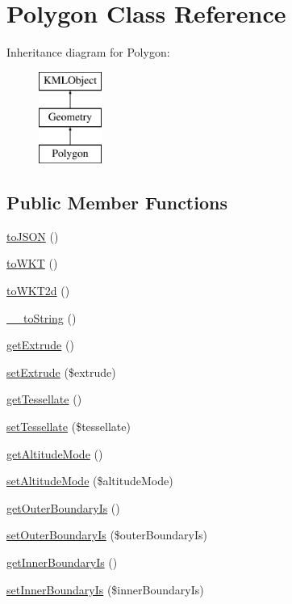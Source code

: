 \hypertarget{classPolygon}{
\section{Polygon Class Reference}
\label{d0/db1/classPolygon}
}
Inheritance diagram for Polygon:\begin{figure}[H]
\begin{center}
\leavevmode
\includegraphics[height=3.000000cm]{d0/db1/classPolygon}
\end{center}
\end{figure}
\subsection*{Public Member Functions}
\begin{DoxyCompactItemize}
\item 
\hyperlink{classPolygon_aace18ec7c7b4f7d6efea2b687b651182}{toJSON} ()
\item 
\hyperlink{classPolygon_a3146997f6a802c028f67fa8ded0abed6}{toWKT} ()
\item 
\hyperlink{classPolygon_a98db55ca6016de176f1f80da4ac580d7}{toWKT2d} ()
\item 
\hyperlink{classPolygon_a6ce5fe3705e52fc696fb3c764990c23c}{\_\-\_\-toString} ()
\item 
\hyperlink{classPolygon_a5e3fb6513f07b244151f09a8c3b0a3b8}{getExtrude} ()
\item 
\hyperlink{classPolygon_af2b8b03de49cc14795d9d6ba46ecd4c7}{setExtrude} (\$extrude)
\item 
\hyperlink{classPolygon_a8f001dcc0ae2f107eda55d8f5b89b444}{getTessellate} ()
\item 
\hyperlink{classPolygon_ac366c4ded55d7795a9abac8c1787cedc}{setTessellate} (\$tessellate)
\item 
\hyperlink{classPolygon_ac02611d8b8a6694be3a5ce42a1b80f3e}{getAltitudeMode} ()
\item 
\hyperlink{classPolygon_a390c3a75fb59518a017daed12b8c6fe1}{setAltitudeMode} (\$altitudeMode)
\item 
\hyperlink{classPolygon_a3f5e1ede39485282154045ebd99a79fe}{getOuterBoundaryIs} ()
\item 
\hyperlink{classPolygon_a78d7ae5d2e0f79f84929b309f8ac4074}{setOuterBoundaryIs} (\$outerBoundaryIs)
\item 
\hyperlink{classPolygon_a50493d318f8c402428cc65318ad3f223}{getInnerBoundaryIs} ()
\item 
\hyperlink{classPolygon_a48a25c3a94307da0e7d5d4b18fd19d81}{setInnerBoundaryIs} (\$innerBoundaryIs)
\end{DoxyCompactItemize}


